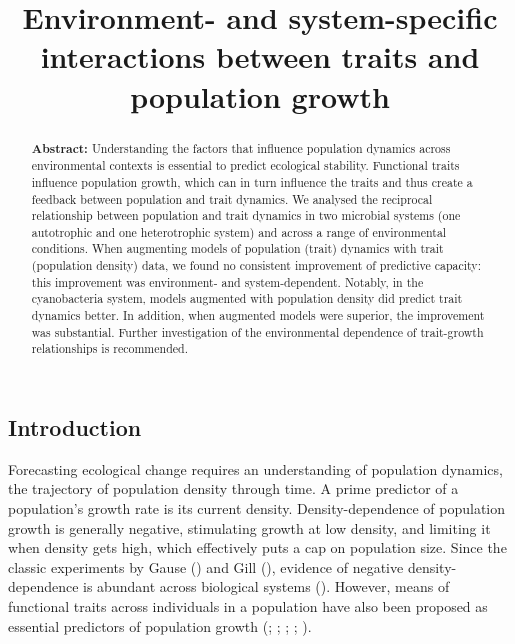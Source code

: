 \documentclass[
  letterpaper,
  DIV=11,
  numbers=noendperiod]{scrartcl}
\title{Environment- and system-specific interactions between traits and
population growth}
\author{}
\date{}
\begin{document}
\maketitle
\begin{abstract}
\textbf{Abstract:} Understanding the factors that influence population
dynamics across environmental contexts is essential to predict
ecological stability. Functional traits influence population growth,
which can in turn influence the traits and thus create a feedback
between population and trait dynamics. We analysed the reciprocal
relationship between population and trait dynamics in two microbial
systems (one autotrophic and one heterotrophic system) and across a
range of environmental conditions. When augmenting models of population
(trait) dynamics with trait (population density) data, we found no
consistent improvement of predictive capacity: this improvement was
environment- and system-dependent. Notably, in the cyanobacteria system,
models augmented with population density did predict trait dynamics
better. In addition, when augmented models were superior, the
improvement was substantial. Further investigation of the environmental
dependence of trait-growth relationships is recommended.
\end{abstract}

\newpage{}

\subsection{Introduction}\label{sec-DAE_introduction}

Forecasting ecological change requires an understanding of population
dynamics, the trajectory of population density through time. A prime
predictor of a population's growth rate is its current density.
Density-dependence of population growth is generally negative,
stimulating growth at low density, and limiting it when density gets
high, which effectively puts a cap on population size. Since the classic
experiments by Gause () and Gill
(), evidence of negative density-dependence
is abundant across biological systems (). However, means of functional traits across individuals in a
population have also been proposed as essential predictors of population
growth (;
;
;
;
).
\end{document}

